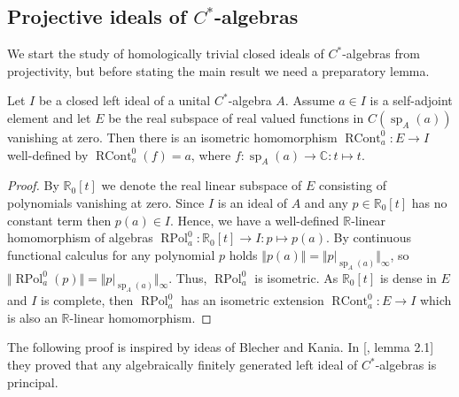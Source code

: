
\subsection{
    Projective ideals of \texorpdfstring{$C^*$}{C*}-algebras}\label{
SubSectionProjectiveIdealsOfCStarAlgebras}

We start the study of homologically trivial closed ideals of $C^*$-algebras from
projectivity, but before stating the main result we need a preparatory lemma.

\begin{lemma}\label{ContFuncCalcOnIdealOfCStarAlg} Let $I$ be a closed left ideal of a
unital $C^*$-algebra $A$. Assume $a\in I$ is a self-adjoint element and let $E$
be the real subspace of real valued functions in $C(\operatorname{sp}_A(a))$
vanishing at zero. Then there is an isometric homomorphism
$\operatorname{RCont}_a^0:E\to I$ well-defined by
$\operatorname{RCont}_a^0(f)=a$, where
$f:\operatorname{sp}_A(a)\to\mathbb{C}:t\mapsto t$.
\end{lemma}
\begin{proof} By $\mathbb{R}_0[t]$ we denote the real linear subspace of $E$
consisting of polynomials vanishing at zero. Since $I$ is an ideal of $A$ and
any $p\in\mathbb{R}_0[t]$ has no constant term then $p(a)\in I$.  Hence, we have 
a well-defined $\mathbb{R}$-linear homomorphism of algebras
$\operatorname{RPol}_a^0:\mathbb{R}_0[t]\to I:p\mapsto p(a)$. By continuous
functional calculus for any polynomial $p$ 
holds $\Vert p(a)\Vert=\Vert p|_{\operatorname{sp}_A(a)}\Vert_\infty$, so
$\Vert\operatorname{RPol}_a^0(p)\Vert
=\Vert p|_{\operatorname{sp}_A(a)}\Vert_\infty$. 
Thus, $\operatorname{RPol}_a^0$ is isometric. 
As $\mathbb{R}_0[t]$ is dense in $E$ and $I$ is complete, then
$\operatorname{RPol}_a^0$ has an isometric extension
$\operatorname{RCont}_a^0:E\to I$ which is also an $\mathbb{R}$-linear
homomorphism. 
\end{proof}

The following proof is inspired by ideas of Blecher and Kania. In
[\cite{BleKanFinGenCStarAlgHilbMod}, lemma 2.1] they proved that any
algebraically finitely generated left ideal of $C^*$-algebras is principal.  

